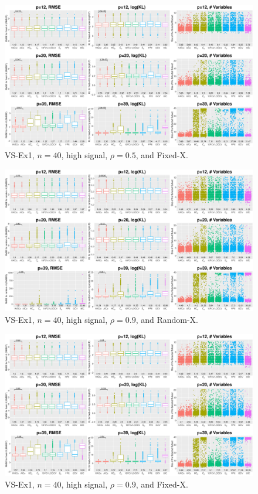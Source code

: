 \begin{figure}[!ht]
\centering
\includegraphics[width=\textwidth]{figures/supplement/fixedx_VS-Ex1_n40_hsnr_rho05.eps}
\caption{VS-Ex1, $n=40$, high signal, $\rho=0.5$, and Fixed-X.}
\end{figure}
\clearpage
\begin{figure}[!ht]
\centering
\includegraphics[width=\textwidth]{figures/supplement/randomx_VS-Ex1_n40_hsnr_rho09.eps}
\caption{VS-Ex1, $n=40$, high signal, $\rho=0.9$, and Random-X.}
\end{figure}
\begin{figure}[!ht]
\centering
\includegraphics[width=\textwidth]{figures/supplement/fixedx_VS-Ex1_n40_hsnr_rho09.eps}
\caption{VS-Ex1, $n=40$, high signal, $\rho=0.9$, and Fixed-X.}
\end{figure}
